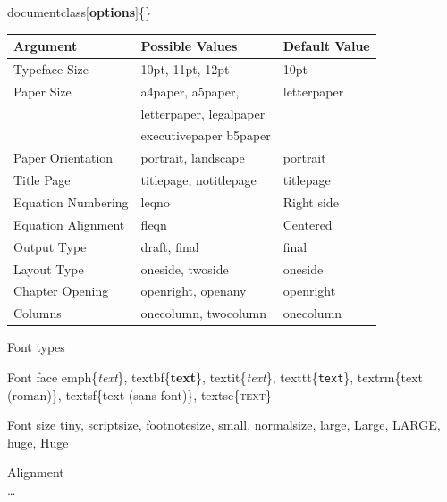 \documentclass[10pt, notes]{beamer}
\begin{document}

\begin{frame}{\bs documentclass$[$\textbf{options}$]$\{\}}
\begin{table}
\renewcommand{\arraystretch}{1.2}
\begin{tabularx}{0.97\textwidth}{lll}
\toprule
\textbf{Argument} & \textbf{Possible Values} & \textbf{Default Value} \\
\midrule
Typeface Size & 10pt, 11pt, 12pt & 10pt   \\
Paper Size & a4paper, a5paper, & letterpaper \\
				& letterpaper, legalpaper &  \\
				& executivepaper b5paper &  \\
Paper Orientation & portrait, landscape & portrait \\
Title Page & titlepage, notitlepage & titlepage \\
Equation Numbering & leqno & Right side \\ 
Equation Alignment & fleqn & Centered \\ 
Output Type				& draft, final & final \\
Layout Type & oneside, twoside & oneside  \\
Chapter Opening & openright, openany & openright \\
Columns & onecolumn, twocolumn & onecolumn \\
\bottomrule
\end{tabularx}
\end{table}
\end{frame}


\begin{frame}{Font types}
\begin{block}{Font face}
\bs emph\{\emph{text}\}, 
\bs textbf\{\textbf{text}\}, 
\bs textit\{\textit{text}\},
\bs texttt\{\texttt{text}\},
\bs textrm\{\textrm{text (roman)}\},
\bs textsf\{\textsf{text (sans font)}\},
\bs textsc\{\textsc{text}\}
\end{block}
\begin{block}{Font size}
\tiny \bs tiny,
\scriptsize \bs scriptsize,
\footnotesize \bs footnotesize,
\small \bs small,
\normalsize \bs normalsize,
\large \bs large,
\Large \bs Large,
\LARGE \bs LARGE,
\huge \bs huge,
\Huge \bs Huge
\end{block}

\begin{block}{Alignment}
\\
\ldots\\
\end{block}
\end{frame}
\end{document}
